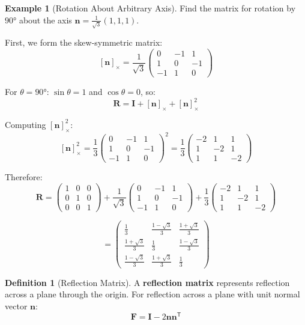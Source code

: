 \documentclass[12pt]{article}
\numberwithin{equation}{section}
\newcommand{\vect}[1]{\boldsymbol{#1}}   %
\newcommand{\mat}[1]{\mathbf{#1}}        %
\newcommand{\trans}{\mathsf{T}}          %
\theoremstyle{plain}
\theoremstyle{definition}
\newtheorem{definition}[theorem]{Definition}
\newtheorem{example}[theorem]{Example}
\theoremstyle{remark}
\begin{document}
\begin{example}[Rotation About Arbitrary Axis]
Find the matrix for rotation by $90°$ about the axis $\vect{n} = \frac{1}{\sqrt{3}}(1, 1, 1)$.

First, we form the skew-symmetric matrix:
$$[\vect{n}]_{\times} = \frac{1}{\sqrt{3}}\begin{pmatrix} 0 & -1 & 1 \\ 1 & 0 & -1 \\ -1 & 1 & 0 \end{pmatrix}$$

For $\theta = 90°$: $\sin\theta = 1$ and $\cos\theta = 0$, so:
$$\mat{R} = \mat{I} + [\vect{n}]_{\times} + [\vect{n}]_{\times}^2$$

Computing $[\vect{n}]_{\times}^2$:
$$[\vect{n}]_{\times}^2 = \frac{1}{3}\begin{pmatrix} 0 & -1 & 1 \\ 1 & 0 & -1 \\ -1 & 1 & 0 \end{pmatrix}^2 = \frac{1}{3}\begin{pmatrix} -2 & 1 & 1 \\ 1 & -2 & 1 \\ 1 & 1 & -2 \end{pmatrix}$$

Therefore:
$$\mat{R} = \begin{pmatrix} 1 & 0 & 0 \\ 0 & 1 & 0 \\ 0 & 0 & 1 \end{pmatrix} + \frac{1}{\sqrt{3}}\begin{pmatrix} 0 & -1 & 1 \\ 1 & 0 & -1 \\ -1 & 1 & 0 \end{pmatrix} + \frac{1}{3}\begin{pmatrix} -2 & 1 & 1 \\ 1 & -2 & 1 \\ 1 & 1 & -2 \end{pmatrix}$$

$$= \begin{pmatrix} \frac{1}{3} & \frac{1-\sqrt{3}}{3} & \frac{1+\sqrt{3}}{3} \\ \frac{1+\sqrt{3}}{3} & \frac{1}{3} & \frac{1-\sqrt{3}}{3} \\ \frac{1-\sqrt{3}}{3} & \frac{1+\sqrt{3}}{3} & \frac{1}{3} \end{pmatrix}$$
\end{example}

\begin{definition}[Reflection Matrix]
A \textbf{reflection matrix} represents reflection across a plane through the origin. For reflection across a plane with unit normal vector $\vect{n}$:
$$\mat{F} = \mat{I} - 2\vect{n}\vect{n}^{\trans}$$
\end{definition}
\end{document}
